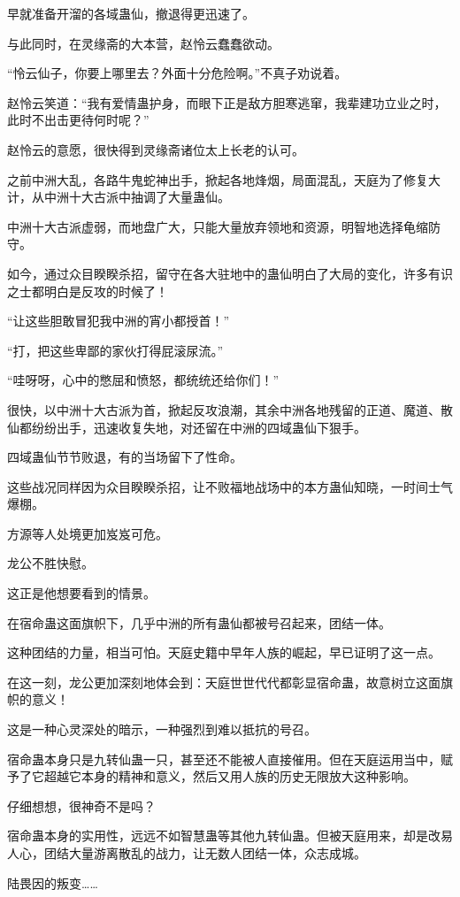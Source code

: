 \begin{this_body}
早就准备开溜的各域蛊仙，撤退得更迅速了。

与此同时，在灵缘斋的大本营，赵怜云蠢蠢欲动。

“怜云仙子，你要上哪里去？外面十分危险啊。”不真子劝说着。

赵怜云笑道：“我有爱情蛊护身，而眼下正是敌方胆寒逃窜，我辈建功立业之时，此时不出击更待何时呢？”

赵怜云的意愿，很快得到灵缘斋诸位太上长老的认可。

之前中洲大乱，各路牛鬼蛇神出手，掀起各地烽烟，局面混乱，天庭为了修复大计，从中洲十大古派中抽调了大量蛊仙。

中洲十大古派虚弱，而地盘广大，只能大量放弃领地和资源，明智地选择龟缩防守。

如今，通过众目睽睽杀招，留守在各大驻地中的蛊仙明白了大局的变化，许多有识之士都明白是反攻的时候了！

“让这些胆敢冒犯我中洲的宵小都授首！”

“打，把这些卑鄙的家伙打得屁滚尿流。”

“哇呀呀，心中的憋屈和愤怒，都统统还给你们！”

很快，以中洲十大古派为首，掀起反攻浪潮，其余中洲各地残留的正道、魔道、散仙都纷纷出手，迅速收复失地，对还留在中洲的四域蛊仙下狠手。

四域蛊仙节节败退，有的当场留下了性命。

这些战况同样因为众目睽睽杀招，让不败福地战场中的本方蛊仙知晓，一时间士气爆棚。

方源等人处境更加岌岌可危。

龙公不胜快慰。

这正是他想要看到的情景。

在宿命蛊这面旗帜下，几乎中洲的所有蛊仙都被号召起来，团结一体。

这种团结的力量，相当可怕。天庭史籍中早年人族的崛起，早已证明了这一点。

在这一刻，龙公更加深刻地体会到：天庭世世代代都彰显宿命蛊，故意树立这面旗帜的意义！

这是一种心灵深处的暗示，一种强烈到难以抵抗的号召。

宿命蛊本身只是九转仙蛊一只，甚至还不能被人直接催用。但在天庭运用当中，赋予了它超越它本身的精神和意义，然后又用人族的历史无限放大这种影响。

仔细想想，很神奇不是吗？

宿命蛊本身的实用性，远远不如智慧蛊等其他九转仙蛊。但被天庭用来，却是改易人心，团结大量游离散乱的战力，让无数人团结一体，众志成城。

陆畏因的叛变……


\end{this_body}
